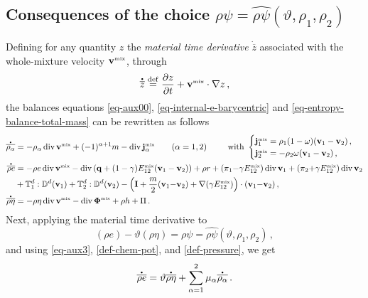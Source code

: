 \documentclass[a4paper]{article}
\begin{document}
\subsection{Consequences of the choice $\rho\psi=\widehat{\rho\psi}(\vartheta,\rho_1,\rho_2)$}
\label{sec-consequences}
Defining for any quantity $z$ the  {\it material time derivative} $\dot{\overline{z}}$ associated with the whole-mixture velocity ${\bf v}^{\mbox{\tiny{mix}}}$, through%
\begin{align}
\label{def-dotz}
  \accentset{\mbox{\large\bfseries .}}{\overline{z}} \stackrel{\mathrm{def}}{=} \frac{\partial z}{\partial t} + {\bf v}^{\mbox{\tiny{mix}}} \cdot \nabla z\,,
\end{align}
the balances equations \eqref{eq-aux00}, \eqref{eq-internal-e-barycentric} and \eqref{eq-entropy-balance-total-mass} can be rewritten as follows
\begin{subequations}
\label{eqs-auxiliary-for-of-balances2}
\begin{align}
\accentset{\mbox{\large\bfseries .}}{\overline{\rho_\alpha}} &= -\rho_\alpha\mathop{\rm div}\nolimits{\bf v}^{\mbox{\tiny{mix}}} + (-1)^{\alpha+1} m - \mathop{\rm div}\nolimits{\bf j}^{\mbox{\tiny{mix}}}_\alpha \qquad(\alpha=1,2)\,\qquad\textrm{ with } \begin{cases} {\bf j}^{\mbox{\tiny{mix}}}_1 = \rho_1 (1-\omega)({\bf v}_1-{\bf v}_2)\,, \\ {\bf j}^{\mbox{\tiny{mix}}}_2 = - \rho_2 \omega ({\bf v}_1-{\bf v}_2)\,, \end{cases} \label{pepa:9995}\\
\accentset{\mbox{\large\bfseries .}}{\overline{\rho e}} &= - \rho e \mathop{\rm div}\nolimits{\bf v}^{\mbox{\tiny{mix}}} -\mathop{\rm div}\nolimits \left( {\bf{q}} + (1-\gamma) E_{12}^{\mbox{\tiny{mix}}}({\bf v}_1-{\bf v}_2)\right) +\rho r + (\pi_1{-}\gamma E_{12}^{\mbox{\tiny{mix}}})\mathop{\rm div}\nolimits{\bf v}_1 + (\pi_2{+}\gamma E_{12}^{\mbox{\tiny{mix}}})\mathop{\rm div}\nolimits{\bf v}_2 \nonumber\\ & + \mathbb{T}^d_1:\mathbb{D}^d({\bf v}_1) + \mathbb{T}^d_2:\mathbb{D}^d({\bf v}_2)- \left({\mathbf{I}} + \frac{m}{2}({\bf v}_1{-}{\bf v}_2) + \nabla(\gamma E_{12}^{\mbox{\tiny{mix}}})\right)\cdot({\bf v}_1{-}{\bf v}_2)\,,\\
\accentset{\mbox{\large\bfseries .}}{\overline{\rho\eta}} &= -\rho\eta\mathop{\rm div}\nolimits{\bf v}^{\mbox{\tiny{mix}}} -\mathop{\rm div}\nolimits\mbox{\boldmath $\Phi$} ^{\mbox{\tiny{mix}}}+ \rho h + \Pi\,.
\end{align}
\end{subequations}
Next, applying the material time derivative to 
\begin{equation}
(\rho e)-\vartheta(\rho\eta) = \rho\psi = \widehat{\rho\psi}(\vartheta,\rho_1,\rho_2)\,,
\end{equation}
and using \eqref{eq-aux3}, \eqref{def-chem-pot}, and \eqref{def-pressure}, we get
\begin{align}
\label{eq-aux-12}
\accentset{\mbox{\large\bfseries .}}{\overline{\rho e}} = \vartheta\accentset{\mbox{\large\bfseries .}}{\overline{\rho\eta}} + \sum_{\alpha=1}^2\mu_\alpha\accentset{\mbox{\large\bfseries .}}{\overline{\rho_\alpha}}\,.
\end{align} 
\end{document}
